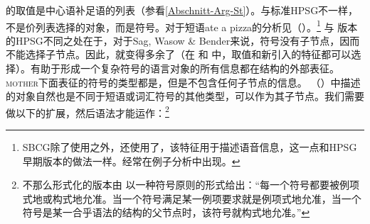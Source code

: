 \noindent
\comps{}的取值是中心语补足语的列表（参看\ref{Abschnitt-Arg-St}）。与标准HPSG\indexhpsgc 不一样，不是价列表选择的对象，而是符号。对于短语ate a pizza的分析见（）。\footnote{%
  SBCG除了使用\phonfc 之外，还使用了\formfc，该特征用于描述语音信息，这一点和HPSG早期版本的做法一样\citep[\S~3.1, \S~3.6]{Sag2012a}。\formfc 经常在例子分析中出现。
}
\ea
\label{feat-geom-swb}
\z
与 \citet{ps2}版本的HPSG不同之处在于，对于Sag, Wasow \& Bender来说，符号没有子节点，因而不能选择子节点。因此，\synsemfc{}就变得多余了（在 和 中，\phonvc 取值和新引入的\formfc 特征都可以选择）。有助于形成一个复杂符号的语言对象的所有信息都在结构的外部表征。\textsc{mother}下面表征的符号的类型都是，但是不包含任何子节点的信息。 （）中描述的对象自然也是不同于短语或词汇符号的其他类型，可以作为其子节点。我们需要做以下的扩展，然后语法才能运作\citep*[]{SWB2003a}：\footnote{%
不那么形式化的版本由 \citet[]{Sag2012a}以一种符号原则的形式给出：“每一个符号都要被例项式地或构式地允准。当一个符号满足某一例项要求就是例项式地允准，当一个符号是某一合乎语法的结构的父节点时，该符号就构式地允准。” 
}
